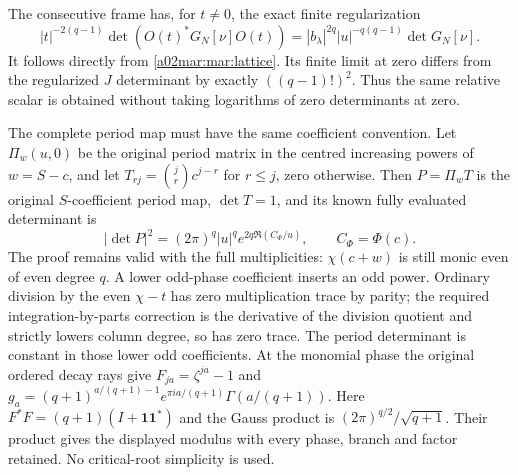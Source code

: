 \documentclass[11pt,a4paper]{article}
\begin{document}
The consecutive frame has, for $t\ne0$, the exact finite
regularization
\begin{equation}\tag{MAR30}\label{a02mar:mar:singulargram}
 |t|^{-2(q-1)}\det(O(t)^*G_N[\nu]O(t))
      =|b_\lambda|^{2q}|u|^{-q(q-1)}\det G_N[\nu].
\end{equation}
It follows directly from \eqref{a02mar:mar:lattice}. Its finite limit
at zero differs from the regularized $J$ determinant by
exactly $((q-1)!)^2$. Thus the same relative scalar is obtained
without taking logarithms of zero determinants at zero.

The complete period map must have the same coefficient convention.
Let $\Pi_w(u,0)$ be the original period matrix in the centred
increasing powers of $w=S-c$, and let
$T_{rj}=\binom jr c^{j-r}$ for $r\le j$, zero otherwise.
Then $P=\Pi_w T$ is the original $S$-coefficient period map,
$\det T=1$, and its known fully evaluated determinant is
\[
 |\det P|^2=(2\pi)^q|u|^q e^{2q\Re(C_\Phi/u)},\qquad
 C_\Phi=\Phi(c).
\]
The proof remains valid with the full multiplicities: $\chi(c+w)$
is still monic even of even degree $q$. A lower odd-phase
coefficient inserts an odd power. Ordinary division by the even
$\chi-t$ has zero multiplication trace by parity; the required
integration-by-parts correction is the derivative of the division
quotient and strictly lowers column degree, so has zero trace.
The period determinant is constant in those lower odd
coefficients. At the monomial phase the original ordered decay
rays give $F_{ja}=\zeta^{ja}-1$ and
$g_a=(q+1)^{a/(q+1)-1}e^{\pi ia/(q+1)}\Gamma(a/(q+1))$.
Here $F^*F=(q+1)(I+\mathbf1\mathbf1^*)$ and the Gauss product
\cite{a02mar:dlmf} is $(2\pi)^{q/2}/\sqrt{q+1}$. Their product gives
the displayed modulus with every phase, branch and factor
retained. No critical-root simplicity is used.
\end{document}

